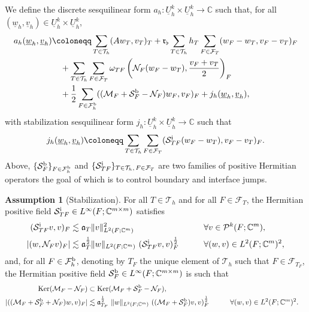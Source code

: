 \documentclass[11pt,a4paper]{article}
\theoremstyle{plain}
\theoremstyle{remark}
\theoremstyle{definition}
\newtheorem{assumption}{Assumption}
\newcommand{\Complex}{\mathbb{C}}
\DeclareMathOperator{\Ker}{Ker}
\newcommand{\Th}{\mathcal{T}_h}
\newcommand{\Fhb}{\mathcal{F}_h^{\rm b}}
\newcommand{\FT}{\mathcal{F}_T}
\newcommand{\Poly}[1]{\mathcal{P}^{#1}}
\newcommand{\Uh}{\underline{U}_h^k}
\newcommand{\norm}[2]{\|#2\|_{#1}}
\newcommand{\Aref}[1][T]{\mathfrak{a}_{#1}}
\newcommand{\Kmin}{\mathfrak{r}_\flat}
\begin{document}
We define the discrete sesquilinear form $a_h : \Uh \times \Uh \to \Complex$ such that, for all $(\underline{w}_h, \underline{v}_h) \in \Uh \times \Uh$,
\begin{equation}\label{eq:ah}
  \begin{aligned}
    a_h(\underline{w}_h, \underline{v}_h)
    &\coloneqq
    \sum_{T \in \Th} (A w_T, v_T)_T
    + \Kmin \sum_{T \in \Th} h_T \sum_{F \in \FT} (w_F - w_T, v_F - v_T)_F
    \\
    &\quad
    + \sum_{T \in \Th} \sum_{F \in \FT} \omega_{TF} \left(\mathcal{N}_F (w_F - w_T), \frac{v_F + v_T}{2}\right)_F
    \\
    &\quad
    + \frac12 \sum_{F \in \Fhb} ((\mathcal{M}_F + \mathcal{S}_F^{\rm b} - \mathcal{N}_F) w_F, v_F)_F
    + j_h(\underline{w}_h, \underline{v}_h),
  \end{aligned}
\end{equation}
with stabilization sesquilinear form $j_h : \Uh \times \Uh \to \Complex$ such that
\begin{equation}\label{eq:sh}
  j_h(\underline{w}_h, \underline{v}_h)
  \coloneqq
  \sum_{T \in \Th} \sum_{F \in \FT} (\mathcal{S}_{TF}^{\rm i} (w_F - w_T), v_F - v_T)_F.
\end{equation}
Above, $\{ \mathcal{S}_F^{\rm b} \}_{F \in \Fhb}$ and $\{ \mathcal{S}_{TF}^{\rm i} \}_{T \in \Th,\, F \in \FT}$ are two families of positive Hermitian operators the goal of which is to control boundary and interface jumps.

\begin{assumption}[Stabilization]\label{ass:stabilization}
  For all $T \in \Th$ and for all $F \in \FT$, the Hermitian positive field $\mathcal{S}_{TF}^{\rm i} \in L^{\infty}(F;\Complex^{m\times m})$ satisfies
  \begin{alignat}{4}
    \label{eq:STFi:boundedness}
    (\mathcal{S}_{TF}^{\rm i} v, v)_F
    &\lesssim \Aref \norm{L^2(F;\Complex^m)}{v}^2
    &\qquad& \forall v \in \Poly{k}(F;\Complex^m),
    \\ \label{eq:STFi:control.NF}
    |(w,\mathcal{N}_F v)_F|
    &\lesssim \Aref^{\frac12} \norm{L^2(F;\Complex^m)}{w}~(\mathcal{S}_{TF}^{\rm i} v, v)_F^{\frac12}
    &\qquad& \forall (w,v) \in L^2(F;\Complex^m)^2,
  \end{alignat}
  and, for all $F \in \Fhb$, denoting by $T_F$ the unique element of $\Th$ such that $F \in \mathcal{F}_{T_F}$, the Hermitian positive field $\mathcal{S}_F^{\rm b} \in L^{\infty}(F;\Complex^{m\times m})$ is such that
  \begin{alignat}{4}\label{eq:SFb:stabilization}
    \Ker (\mathcal{M}_F - \mathcal{N}_F)
    &\subset \Ker (\mathcal{M}_F +  \mathcal{S}_F^{\rm b} - \mathcal{N}_F),
    \\ \label{eq:SFb:control.NF}
    |((\mathcal{M}_F + \mathcal{S}_F^{\rm b} + \mathcal{N}_F) w, v)_F|
    &\lesssim \Aref[T_F]^{\frac12}~\norm{L^2(F;\Complex^m)}{w}~((\mathcal{M}_F + \mathcal{S}_F^{\rm b}) v, v)_F^{\frac12}
    &\qquad& \forall (w,v) \in L^2(F;\Complex^m)^2.
  \end{alignat}
\end{assumption}
\end{document}
